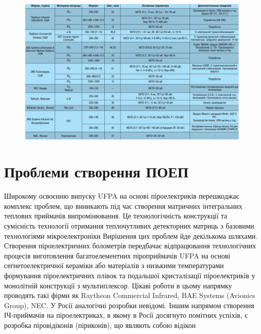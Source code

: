 \documentclass[a4paper,14pt]{extreport}
\begin{document}
\begin{figure}[h!]
\includegraphics[width=0.9\linewidth]{t2.png}

\label{ris2}
\end{figure}

\chapter{Проблеми створення ПОЕП}\par
Широкому освоєнню випуску UFPA на основі піроелектриків перешкоджає комплекс проблем, що виникають під час створення матричних інтегральних теплових приймачів випромінювання. Це технологічність
конструкції та сумісність технології отримання теплочутливих детекторних матриць з базовими технологіями мікроелектроніки
Вирішення цих проблем йде декількома шляхами. Створення піроелектричних болометрів передбачає відпрацювання технологічних
процесів виготовлення багатоелементних піроприймачів UFPA на
основі сегнетоелектричної кераміки або матеріалів з низькими
температурами формування піроелектричних плівок та подальшої кристалізації піроелектриків у монолітній конструкції з
мультиплексор. Цікаві роботи в цьому напрямку проводять такі фірми як Raytheon Commercial Infrared, BAE Systems
(Avionics Group), NEC. У Росії аналогічні розробки невідомі.
Іншим напрямом створення ІЧ-приймачів на піроелектриках, в якому в Росії досягнуто помітних успіхів, є розробка піровідіконів (піриконів), що являють собою відікон
\end{document}
